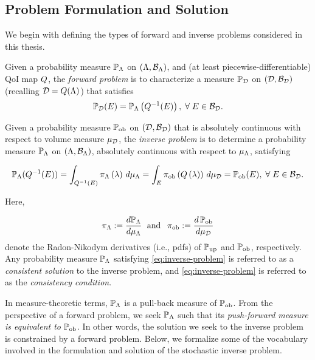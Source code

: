 \subsection{Problem Formulation and Solution}

We begin with defining the types of forward and inverse problems considered in this thesis.

\begin{defn}\label{defn:forward-problem}
  Given a probability measure $\mathbb{P}_{\Lambda}$ on $({\Lambda}, \mathcal{B}_{{\Lambda}})$, and (at least piecewise-differentiable) QoI map $Q$, the \emph{forward problem} is to characterize a measure $\mathbb{P}_{\mathcal{D}}$ on $(\mathcal{D}, \mathcal{B}_{\mathcal{D}})$ (recalling $\mathcal{D} = Q({\Lambda})$) that satisfies
  \begin{equation}\label{eq:forward-problem}
    \mathbb{P}_{\mathcal{D}} (E) = \mathbb{P}_{\Lambda} \left ( Q^{-1}(E) \right ), \; \forall \; E \in \mathcal{B}_{\mathcal{D}}.
  \end{equation}
\end{defn}

\begin{defn}\label{defn:inverse-problem}
  Given a probability measure $\operatorname*{\mathbb{P}_{ob}}$ on $(\mathcal{D}, \mathcal{B}_{\mathcal{D}})$ that is absolutely continuous with respect to volume measure $\mu_{\mathcal{D}}$, the \emph{inverse problem} is to determine a probability measure $\mathbb{P}_{\Lambda}$ on $({\Lambda}, \mathcal{B}_{{\Lambda}})$, absolutely continuous with respect to $\mu_{{\Lambda}}$, satisfying

  \begin{equation}\label{eq:inverse-problem}
    \mathbb{P}_{\Lambda} (Q^{-1}(E)) = \int_{Q^{-1}(E)} \pi_{\Lambda} \left ( \lambda \right ) \, d\mu_{{\Lambda}} = \int_E \operatorname*{\pi_{ob}} \left ( Q\left ( \lambda \right ) \right ) \, d\mu_{\mathcal{D}} = \operatorname*{\mathbb{P}_{ob}}(E), \; \forall \; E \in \mathcal{B}_{\mathcal{D}}.
  \end{equation} 

  \noindent Here,
   
  \begin{equation*}
    \pi_{\Lambda} := \frac{d\mathbb{P}_{\Lambda}}{d\mu_{{\Lambda}}} \;\text{ and }\; \operatorname*{\pi_{ob}} := \frac{d\operatorname*{\mathbb{P}_{ob}}}{d\mu_{\mathcal{D}}}
  \end{equation*}
  denote the Radon-Nikodym derivatives (i.e., pdfs) of $\operatorname*{\mathbb{P}_{up}}$ and $\operatorname*{\mathbb{P}_{ob}}$, respectively. 
  Any probability measure $\mathbb{P}_{\Lambda}$ satisfying \eqref{eq:inverse-problem} is referred to as a \emph{consistent solution} to the inverse problem, and \eqref{eq:inverse-problem} is referred to as the \emph{consistency condition}.
\end{defn}

In measure-theoretic terms, $\mathbb{P}_{\Lambda}$ is a pull-back measure of $\operatorname*{\mathbb{P}_{ob}}$.
From the perspective of a forward problem, we seek $\mathbb{P}_{\Lambda}$ such that its \emph{push-forward measure is equivalent to} $\operatorname*{\mathbb{P}_{ob}}$. 
In other words, the solution we seek to the inverse problem is constrained by a forward problem. 
Below, we formalize some of the vocabulary involved in the formulation and solution of the stochastic inverse problem.

